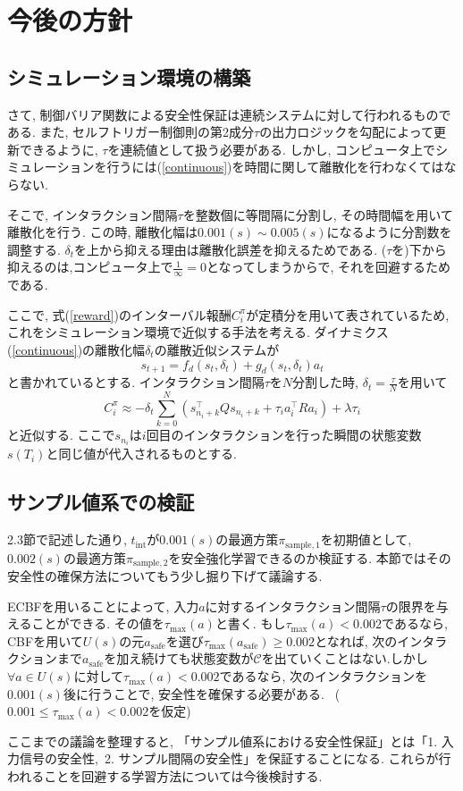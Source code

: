 \documentclass{jsarticle}
\begin{document}
\section{今後の方針}
\subsection{シミュレーション環境の構築}
さて, 制御バリア関数による安全性保証は連続システムに対して行われるものである. また, セルフトリガー制御則の第2成分$\tau$の出力ロジックを勾配によって更新できるように, $\tau$を連続値として扱う必要がある. しかし, コンピュータ上でシミュレーションを行うには(\ref{continuous})を時間に関して離散化を行わなくてはならない.\par
そこで, インタラクション間隔$\tau$を整数個に等間隔に分割し, その時間幅を用いて離散化を行う. この時, 離散化幅は$0.001(s)\sim 0.005(s)$になるように分割数を調整する. $\delta_t$を上から抑える理由は離散化誤差を抑えるためである. ($\tau$を)下から抑えるのは,コンピュータ上で$\frac{1}{\infty}=0$となってしまうからで, それを回避するためである.\par
ここで, 式(\ref{reward})のインターバル報酬$C^{\pi}_i$が定積分を用いて表されているため, これをシミュレーション環境で近似する手法を考える. ダイナミクス(\ref{continuous})の離散化幅$\delta_t$の離散近似システムが
\begin{equation}
	s_{t+1} = f_d(s_t, \delta_t) + g_d(s_t, \delta_t)a_t
\end{equation}
と書かれているとする. インタラクション間隔$\tau$を$N$分割した時, $\delta_t = \frac{\tau}{N}$を用いて
\begin{equation}
	C^{\pi}_i \approx -\delta_t\sum_{k=0}^{N}(s_{n_i+k}^{\top}Qs_{n_i+k}+\tau_ia_i^{\top}Ra_i) + \lambda \tau_i
\end{equation}
と近似する. ここで$s_{n_i}$は$i$回目のインタラクションを行った瞬間の状態変数$s(T_i)$と同じ値が代入されるものとする.\par

\subsection{サンプル値系での検証}
2.3節で記述した通り, $t_{\textrm{int}}$が$0.001(s)$の最適方策$\pi_{\textrm{sample},1}$を初期値として,~$0.002(s)$の最適方策$\pi_{\textrm{sample},2}$を安全強化学習できるのか検証する. 本節ではその安全性の確保方法についてもう少し掘り下げて議論する.\par
ECBFを用いることによって, 入力$a$に対するインタラクション間隔$\tau$の限界を与えることができる. その値を$\tau_{\textrm{max}}(a)$と書く. もし$\tau_{\textrm{max}}(a)<0.002$であるなら, CBFを用いて$U(s)$の元$a_{\textrm{safe}}$を選び$\tau_{\textrm{max}}(a_{\textrm{safe}})\geq0.002$となれば, 次のインタラクションまで$a_{\textrm{safe}}$を加え続けても状態変数が$\mathcal{C}$を出ていくことはない.しかし$\forall a \in U(s)$に対して$\tau_{\textrm{max}}(a)<0.002$であるなら, 次のインタラクションを$0.001(s)$後に行うことで, 安全性を確保する必要がある. ~($0.001\leq\tau_{\textrm{max}}(a)<0.002$を仮定)\par
ここまでの議論を整理すると, 「サンプル値系における安全性保証」とは「1. 入力信号の安全性,~2. サンプル間隔の安全性」を保証することになる. これらが行われることを回避する学習方法については今後検討する.
\end{document}
